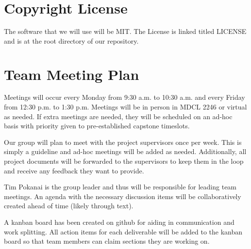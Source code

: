 \documentclass{article}
\begin{document}
\section{Copyright License}

\par{The software that we will use will be MIT. The License is linked titled LICENSE and is at the root directory of our repository.}


\section{Team Meeting Plan}





\par{\indent Meetings will occur every Monday from 9:30 a.m. to 10:30 a.m. and every Friday from 12:30 p.m. to 1:30 p.m. Meetings will
be in person in MDCL 2246 or virtual as needed. If extra meetings are needed, they will be scheduled on an ad-hoc basis with priority given to pre-established capstone timeslots.

Our group will plan to meet with the project supervisors once per week. This is simply a guideline and ad-hoc meetings
will be added as needed. Additionally, all project documents will be forwarded to the supervisors to keep them in the loop and receive any feedback they want to provide.

Tim Pokanai is the group leader and thus will be responsible for leading team meetings. An agenda with the necessary 
discussion items will be collaboratively created ahead of time (likely through text).

A kanban board has been created on github for aiding in communication and work splitting. All action items for each deliverable will
be added to the kanban board so that team members can claim sections they are working on.
}

\end{document}

